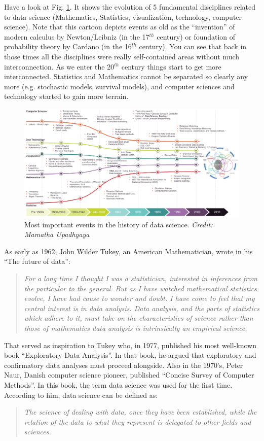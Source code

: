 \documentclass[10pt]{PhDthesisPSnPDF}%
\begin{document}
Have a look at Fig. \ref{fig:Analytics}. It shows the evolution of 5 fundamental disciplines related to data science (Mathematics, Statistics, visualization, technology, computer science). Note that this cartoon depicts events as old as the ``invention'' of modern calculus by Newton/Leibniz (in the 17$^{th}$ century) or foundation of probability theory by Cardano (in the 16$^{th}$ century). You can see that back in those times all the disciplines were really self-contained areas without much interconnection. As we enter the 20$^{th}$ century things start to get more interconnected. Statistics and Mathematics cannot be separated so clearly any more (e.g. stochastic models, survival models), and computer sciences and technology started to gain more terrain. 
\newpage
\begin{figure}[h]
	\begin{center}
			\includegraphics[scale=0.25]{HistoryCH1}
	\end{center}
	\caption{Most important events in the history of data science. \textit{Credit: Mamatha Upadhyaya}}
	\label{fig:Analytics}
\end{figure} 

As early as 1962, John Wilder Tukey, an American Mathematician, wrote in his ``The future of data'':
\begin{quotation}
\textit{For a long time I thought I was a statistician, interested in inferences from the particular to the general. But as I have watched mathematical statistics evolve, I have had cause to wonder and doubt. I have come to feel that my central interest is in data analysis. Data analysis, and the parts of statistics which adhere to it, must take on the characteristics of science rather than those of mathematics data analysis is intrinsically an empirical science.}
\end{quotation} 
 
That served as inspiration to Tukey who, in 1977, published his most well-known book ``Exploratory Data Analysis''. In that book, he argued that exploratory and confirmatory data analyses must proceed alongside. Also in the 1970's, Peter Naur, Danish computer science pioneer, published ``Concise Survey of Computer Methods''. In this book, the term data science was used for the first time. According to him, data science can be defined as:
\begin{quotation}
\textit{The science of dealing with data, once they have been established, while the relation of the data to what they represent is delegated to other fields and sciences.}
\end{quotation} 
\end{document}
